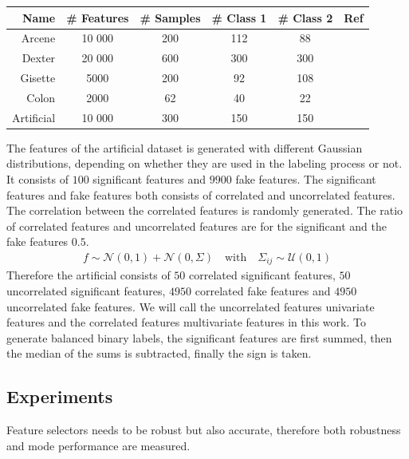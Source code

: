 \documentclass[twoside,11pt]{article}
\begin{document}
\begin{center}
    \begin{tabular}{| r | c | c | c | c | c |}
    \hline
    Name & \# Features & \# Samples & \# Class 1 & \# Class 2 & Ref\\ \hline
    Arcene & 10 000 & 200 & 112 & 88 & \cite{NIPS} \\
    Dexter & 20 000 & 600 & 300 & 300 & \cite{NIPS} \\
    Gisette & 5000 & 200 & 92 & 108 & \cite{NIPS} \\
    Colon & 2000 & 62 & 40 & 22 &  \cite{alon1999broad} \\
    Artificial & 10 000 & 300 & 150 & 150 & \\
    \hline
    \end{tabular}
\end{center}

The features of the artificial dataset is generated with different Gaussian distributions, depending on whether they are used in the labeling process or not. It consists of $100$ significant features and $9900$ fake features. The significant features and fake features both consists of correlated and uncorrelated features. The correlation between the correlated features is randomly generated. The ratio of correlated features and uncorrelated features are for the significant and the fake features $0.5$. 
\begin{align}
f \sim \mathcal{N}(0, 1) + \mathcal{N}(0, \Sigma)  \quad \text{with} \quad \Sigma_{ij} \sim \mathcal{U}(0,1)
\end{align}
Therefore the artificial consists of $50$ correlated significant features, $50$ uncorrelated significant features, $4950$ correlated fake features and $4950$ uncorrelated fake features. We will call the uncorrelated features univariate features and the correlated features multivariate features in this work.
To generate balanced binary labels, the significant features are first summed, then the median of the sums is subtracted, finally the sign is taken. 


\subsection{Experiments}
\label{sec:experiments}

Feature selectors needs to be robust but also accurate, therefore both robustness and mode performance are measured.
\end{document}
